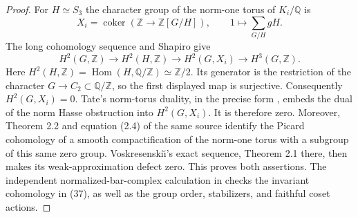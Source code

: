 \begin{proof}
For \(H\simeq S_3\) the character group of the
norm-one torus of \(K_i/\mathbb Q\) is
\[
 X_i=\operatorname{coker}
       (\mathbb Z\longrightarrow\mathbb Z[G/H]),
 \qquad 1\longmapsto\sum_{G/H}gH.                   \tag{38}
\]
The long cohomology sequence and Shapiro give
\[
 H^2(G,\mathbb Z)\longrightarrow
 H^2(H,\mathbb Z)\longrightarrow H^2(G,X_i)
                  \longrightarrow H^3(G,\mathbb Z).
\]
Here \(H^2(H,\mathbb Z)=\operatorname{Hom}
(H,\mathbb Q/\mathbb Z)\simeq\mathbb Z/2\).
Its generator is the restriction of the character
\(G\to C_2\subset\mathbb Q/\mathbb Z\), so the
first displayed map is surjective. Consequently
\(H^2(G,X_i)=0\).
Tate's norm-torus duality, in the precise form
\cite[Theorem 2.3, equation (2.6), and Definition 2.5]
{GhostMacedoNewton2022}, embeds the dual of the
norm Hasse obstruction into \(H^2(G,X_i)\).
It is therefore zero. Moreover, Theorem 2.2 and
equation (2.4) of the same source identify the
Picard cohomology of a smooth compactification of
the norm-one torus with a subgroup of this same
zero group. Voskresenski\u\i's exact sequence,
Theorem 2.1 there, then makes its weak-approximation
defect zero. This proves both assertions. The
independent normalized-bar-complex calculation in
checks the invariant cohomology in (37), as well as
the group order, stabilizers, and faithful coset actions.
\end{proof}

